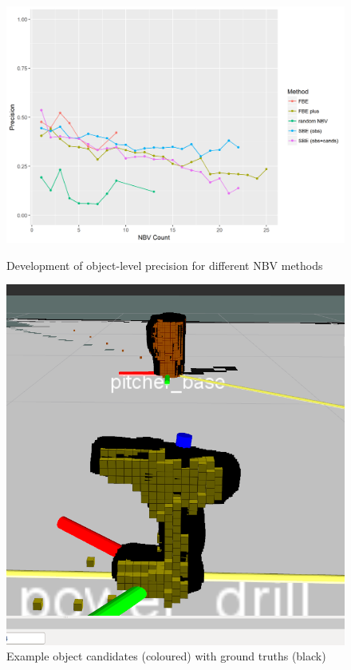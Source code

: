 
\begin{figure}
	\centering
		\includegraphics[width=0.8\linewidth]{src/Plots/precision_vs_nbv_count_scattered.png}
		\caption{Development of object-level precision for different NBV methods}
		\includegraphics[width=0.35\linewidth]{src/drill2.png}
		\caption{Example object candidates (coloured) with ground truths (black)}
\end{figure}


